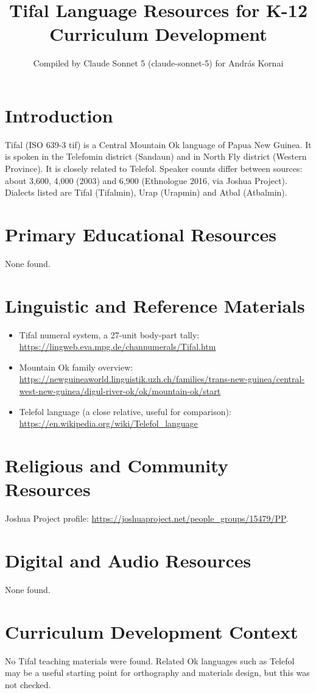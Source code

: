 \documentclass[12pt]{article}
\title{Tifal Language Resources for K-12 Curriculum Development}
\author{Compiled by Claude Sonnet 5 (claude-sonnet-5) for Andr\'as Kornai}
\date{}
\begin{document}
\maketitle
\section{Introduction}
Tifal (ISO 639-3 tif) is a Central Mountain Ok language of Papua New Guinea. It is spoken in the Telefomin district (Sandaun) and in North Fly district (Western Province). It is closely related to Telefol. Speaker counts differ between sources: about 3,600, 4,000 (2003) and 6,900 (Ethnologue 2016, via Joshua Project). Dialects listed are Tifal (Tifalmin), Urap (Urapmin) and Atbal (Atbalmin).
\section{Primary Educational Resources}
None found.
\section{Linguistic and Reference Materials}
\begin{itemize}
\item Tifal numeral system, a 27-unit body-part tally: \url{https://lingweb.eva.mpg.de/channumerals/Tifal.htm}
\item Mountain Ok family overview: \url{https://newguineaworld.linguistik.uzh.ch/families/trans-new-guinea/central-west-new-guinea/digul-river-ok/ok/mountain-ok/start}
\item Telefol language (a close relative, useful for comparison): \url{https://en.wikipedia.org/wiki/Telefol_language}
\end{itemize}
\section{Religious and Community Resources}
Joshua Project profile: \url{https://joshuaproject.net/people_groups/15479/PP}.
\section{Digital and Audio Resources}
None found.
\section{Curriculum Development Context}
No Tifal teaching materials were found. Related Ok languages such as Telefol may be a useful starting point for orthography and materials design, but this was not checked.
\end{document}
